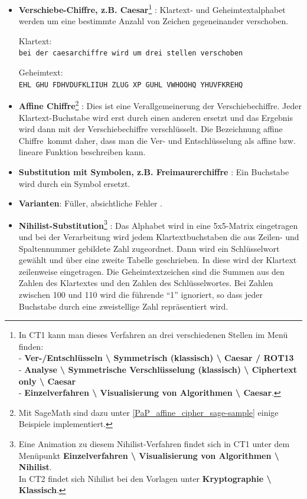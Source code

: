 \begin{refsegment}
\begin{itemize}
\item {\bf Verschiebe-Chiffre, z.B. Caesar}\footnote{In CT1
   kann man dieses Verfahren an drei verschiedenen Stellen im Menü finden:\\
   - {\bf Ver-/Entschlüsseln \textbackslash{} Symmetrisch (klassisch)
     \textbackslash{} Caesar / ROT13} \\
   - {\bf Analyse \textbackslash{} Symmetrische Verschlüsselung (klassisch)
     \textbackslash{} Ciphertext only \textbackslash{} Caesar} \\
   - {\bf Einzelverfahren \textbackslash{} Visualisierung von Algorithmen
     \textbackslash{} Caesar}.
   }
   \cite{Singh2001}%
   : Klartext- und Geheimtextalphabet werden um eine bestimmte Anzahl von
   Zeichen gegeneinander verschoben.

   Klartext:\\ 	\texttt{bei der caesarchiffre wird um drei stellen verschoben}

   Geheimtext:\\ \texttt{EHL GHU FDHVDUFKLIIUH ZLUG XP GUHL VWHOOHQ YHUVFKREHQ}


\item {\bf Affine Chiffre}\footnote{
   Mit SageMath sind dazu unter \ref{PaP_affine_cipher_sage-sample} einige Beispiele
   implementiert.}%
   : Dies ist eine Verallgemeinerung
   der Verschiebechiffre. Jeder Klartext-Buchstabe wird erst durch einen anderen
   ersetzt und das Ergebnis wird dann mit der Verschiebechiffre verschlüsselt.
   Die Bezeichnung \glqq affine Chiffre\grqq~kommt daher, dass man die
   Ver- und Entschlüsselung als affine bzw. lineare Funktion beschreiben kann.


\item {\bf Substitution mit Symbolen, z.B. Freimaurerchiffre}
   \cite{Singh2001}: Ein Buchstabe wird durch ein Symbol ersetzt.

\item {\bf Varianten}: Füller, absichtliche Fehler \cite{Singh2001}.

\item {\bf Nihilist-Substitution}\footnote{Eine Animation zu diesem
   Nihilist-Verfahren findet sich in CT1 unter dem Menüpunkt
     {\bf Einzelverfahren \textbackslash{} Visualisierung von Algorithmen
     \textbackslash{} Nihilist}.\\
     In CT2 findet sich Nihilist bei den Vorlagen unter
     {\bf Kryptographie \textbackslash{} Klassisch}.
   }
   \cite{ACA2002}: Das Alphabet wird in
   eine 5x5-Matrix eingetragen und bei der Verarbeitung wird jedem Klartextbuchstaben
   die aus Zeilen- und Spaltennummer gebildete Zahl zugeordnet.
   Dann wird ein Schlüsselwort gewählt und über eine zweite Tabelle geschrieben.
   In diese wird der Klartext zeilenweise eingetragen.
   Die Geheimtextzeichen sind die Summen aus den
   Zahlen des Klartextes und den Zahlen des Schlüsselwortes. Bei Zahlen
   zwischen 100 und 110 wird die führende "`1"' ignoriert, so dass jeder
   Buchstabe durch eine zweistellige Zahl repräsentiert wird.


\end{itemize}
\end{refsegment}
